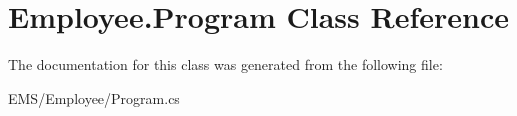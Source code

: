 \hypertarget{class_employee_1_1_program}{\section{Employee.\-Program Class Reference}
\label{class_employee_1_1_program}
}


The documentation for this class was generated from the following file\-:\begin{DoxyCompactItemize}
\item 
E\-M\-S/\-Employee/Program.\-cs\end{DoxyCompactItemize}
